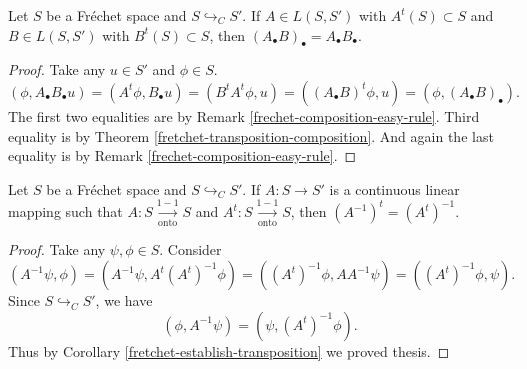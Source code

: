\documentclass[main.tex]{subfiles}
\begin{document}
\begin{theorem}
\label{fretchet-bullet-composition}
Let $S$ be a Fr\'echet space and $S \hookrightarrow_C S'$. If $A\in L(S,S')$ with $A^t(S)\subset S$ and $B\in L(S, S')$ with $B^t(S)\subset S$, then $(A_\bullet B)_\bullet = A_\bullet B_\bullet$.
\end{theorem}
\begin{proof}
Take any $u\in S'$ and $\phi\in S$.
\begin{equation}
(\phi, A_\bullet B_\bullet u) = (A^t\phi, B_\bullet u) = (B^t A^t \phi, u) = ((A_\bullet B)^t\phi, u) = (\phi, (A_\bullet B)_\bullet).
\end{equation}
The first two equalities are by Remark \ref{frechet-composition-easy-rule}. Third equality is by Theorem \ref{fretchet-transposition-composition}. And again the last equality is by Remark \ref{frechet-composition-easy-rule}.
\end{proof}

\begin{theorem}
\label{fretchet-inverse-of-transposition}
Let $S$ be a Fr\'echet space and $S \hookrightarrow_C S'$. If $A:S\to S'$ is a continuous linear mapping such that $A:S \underset{\text{onto}}{\overset{1-1}{\to}} S$ and $A^t: S \underset{\text{onto}}{\overset{1-1}{\to}} S$, then $(A^{-1})^t = (A^t)^{-1}$.
\end{theorem}
\begin{proof}
Take any $\psi, \phi\in S$. Consider 
\begin{equation}
(A^{-1}\psi, \phi) = (A^{-1}\psi, A^t (A^t)^{-1}\phi) = ((A^t)^{-1}\phi, AA^{-1}\psi) = ((A^t)^{-1}\phi, \psi).
\end{equation}
Since $S \hookrightarrow_C S'$, we have
\begin{equation}
(\phi, A^{-1}\psi) = (\psi, (A^t)^{-1}\phi).
\end{equation}
Thus by Corollary \ref{fretchet-establish-transposition} we proved thesis.
\end{proof}
\end{document}
